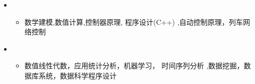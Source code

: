   \begin{itemize}[leftmargin=*]

    \item
      {\small
      \begin{itemize}
        \item{数学建模,数值计算,控制器原理, 程序设计(C++) ,自动控制原理，列车网络控制}
      \end{itemize}
      }
      \item
      {\small
      \begin{itemize}
        \item{数值线性代数，应用统计分析，机器学习， 时间序列分析 ,数据挖掘，数据库系统，数据科学程序设计}
      \end{itemize}
      }
      
      
      
  \end{itemize} 